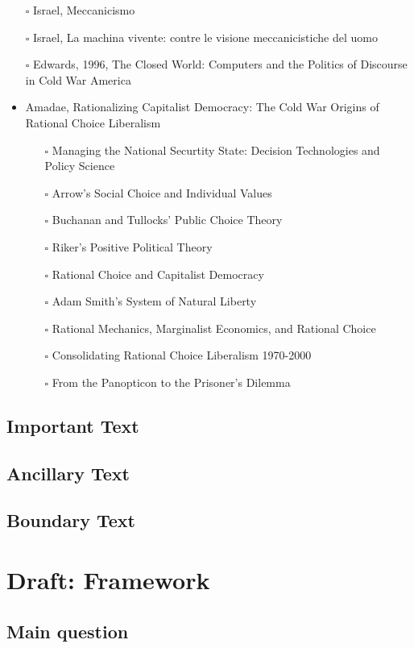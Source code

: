\documentclass[paper=B6,portrait,twoside=true,twocolumn=false,headinclude=true,footinclude=false,fontsize=12,BCOR=10mm,DIV=calc,pagesize=auto,titlepage=firstiscover,mpinclude=false,headings=normal,headings=twolinechapter,open=right,toc=graduated,chapterprefix=false,numbers=endperiod,parskip=half+]{scrbook}
\theoremstyle{definition}
\begin{document}
\begin{itemize}
\item[{$\square$}] Israel,  Meccanicismo
\item[{$\square$}] Israel, La machina vivente: contre le visione meccanicistiche del uomo
\item[{$\square$}] Edwards, 1996, The Closed World: Computers and the Politics of Discourse in Cold War America
\item\relax [0/9] Amadae, Rationalizing Capitalist Democracy: The Cold War Origins of
Rational Choice Liberalism
\begin{itemize}
\item[{$\square$}] Managing the National Securtity State: Decision Technologies and Policy Science
\item[{$\square$}] Arrow's Social Choice and Individual Values
\item[{$\square$}] Buchanan and Tullocks' Public Choice Theory
\item[{$\square$}] Riker's Positive Political Theory
\item[{$\square$}] Rational Choice and Capitalist Democracy
\item[{$\square$}] Adam Smith's System of Natural Liberty
\item[{$\square$}] Rational Mechanics, Marginalist Economics, and Rational Choice
\item[{$\square$}] Consolidating Rational Choice Liberalism 1970-2000
\item[{$\square$}] From the Panopticon to the Prisoner's Dilemma
\end{itemize}
\end{itemize}
\section{Important Text}
\label{sec:org217b12c}
\lipsum
\section{Ancillary Text}
\label{sec:org4cd2759}
\lipsum
\section{Boundary Text}
\label{sec:org853ce88}
\lipsum
\chapter{Draft: Framework}
\label{sec:org7436120}
\section{Main question}
\label{sec:org5a6b731}
\lipsum
\end{document}
